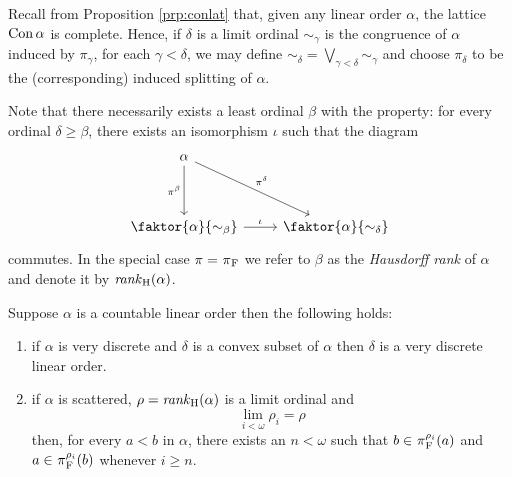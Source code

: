 Recall from Proposition \ref{prp:conlat} that, given any linear order $\alpha$,
the lattice $\operatorname{Con}\alpha$ is complete.  Hence, if $\delta$ is a limit ordinal
$\sim_\gamma$ is the congruence of $\alpha$ induced by $\pi_\gamma$, for each
$\gamma<\delta$, we may define $\sim_\delta=\bigvee_{\gamma<\delta}\sim_\gamma$
and choose $\pi_\delta$ to be the (corresponding) induced splitting of $\alpha$.

Note that there necessarily exists a least ordinal $\beta$ with the property:
for every ordinal $\delta\geq\beta$, there exists an isomorphism $\iota$ such
that the diagram
\begin{equation}
	\begin{tikzcd}
		\alpha\arrow[dd,"{\pi^\beta}"']\arrow[rdd,"{\pi^\delta}"]&\\
									 &\\
		\faktor{\alpha}{\sim_\beta}\arrow[r,"{\iota}"]&\faktor{\alpha}{\sim_\delta}
	\end{tikzcd}
\end{equation}
commutes.  In the special case $\pi=\prescript{}{}{\pi}_\mathrm{F}$ we refer to $\beta$ as the
\textit{Hausdorff rank} of $\alpha$ and denote it by $\mathit{rank}_\mathrm{H}(\alpha)$.

\begin{lem}
	Suppose $\alpha$ is a countable linear order then the following holds:
	\begin{enumerate}
		\item	if $\alpha$ is very discrete and $\delta$ is a convex subset of
				$\alpha$ then $\delta$ is a very discrete linear order.
		\item	if $\alpha$ is scattered, $\rho=\mathit{rank}_\mathrm{H}(\alpha)$ is a limit
				ordinal and
				\begin{equation}
					\lim_{i<\omega}\rho_i=\rho
				\end{equation}
				then, for every $a<b$ in $\alpha$, there exists an $n<\omega$
				such that $b\in\prescript{}{}{\pi}_\mathrm{F}^{\rho_i}(a)$ and
				$a\in\prescript{}{}{\pi}_\mathrm{F}^{\rho_i}(b)$ whenever $i\geq n$.
	\end{enumerate}
\end{lem}

